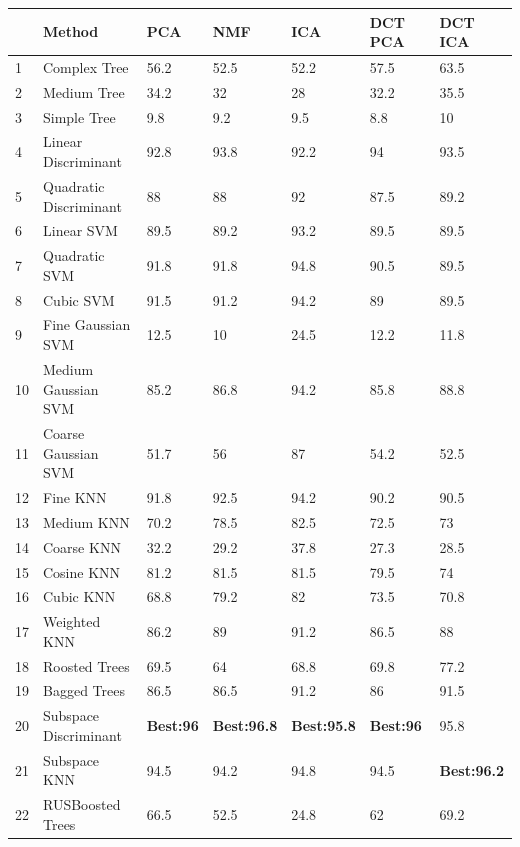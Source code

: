 \begin{center}
\begin{tabular}{|l|l|l|l|l|l|l|}
\hline
&Method&PCA&NMF&ICA& DCT PCA & DCT ICA\\\hline
1&Complex Tree &56.2&52.5&52.2&57.5&63.5\\\hline
2&Medium Tree & 34.2&32&28&32.2&35.5\\\hline
3&Simple Tree & 9.8&9.2&9.5&8.8&10\\\hline
4&Linear Discriminant & 92.8&93.8&92.2&94&93.5\\\hline
5&Quadratic Discriminant & 88&88&92&87.5&89.2\\\hline
6&Linear SVM& 89.5&89.2&93.2&89.5&89.5\\\hline
7&Quadratic SVM&91.8&91.8&94.8&90.5&89.5\\\hline
8&Cubic SVM& 91.5&91.2&94.2&89&89.5\\\hline
9&Fine Gaussian SVM&12.5&10&24.5&12.2&11.8\\\hline
10&Medium Gaussian SVM&85.2&86.8&94.2&85.8&88.8\\\hline
11&Coarse Gaussian SVM&51.7&56&87&54.2&52.5\\\hline
12&Fine KNN&91.8&92.5&94.2&90.2&90.5\\\hline
13&Medium KNN&70.2&78.5&82.5&72.5&73\\\hline
14&Coarse KNN&32.2&29.2&37.8&27.3&28.5\\\hline
15&Cosine KNN&81.2&81.5&81.5&79.5&74\\\hline
16&Cubic KNN&68.8&79.2&82&73.5&70.8\\\hline
17&Weighted KNN&86.2&89&91.2&86.5&88\\\hline
18&Roosted Trees&69.5&64&68.8&69.8&77.2\\\hline
19&Bagged Trees&86.5&86.5&91.2&86&91.5\\\hline
20&Subspace Discriminant&\textbf{Best:96}&\textbf{Best:96.8}&\textbf{Best:95.8}&\textbf{Best:96}&95.8\\\hline
21&Subspace KNN&94.5&94.2&94.8&94.5&\textbf{Best:96.2}\\\hline
22&RUSBoosted Trees&66.5&52.5&24.8&62&69.2\\\hline
\end{tabular}
\end{center}


